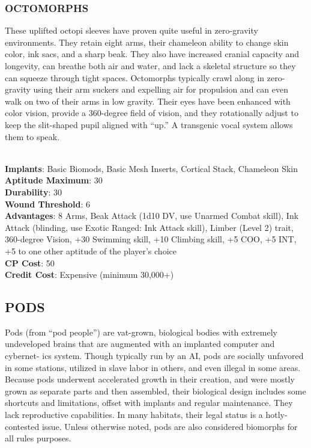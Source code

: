 \subsubsection{OCTOMORPHS}
These uplifted octopi sleeves have proven quite useful in zero-gravity
environments. They retain eight arms, their chameleon ability to change skin
color, ink sacs, and a sharp beak. They also have increased cranial capacity
and longevity, can breathe both air and water, and lack a skeletal structure so
they can squeeze through tight spaces. Octomorphs typically crawl along in
zero-gravity using their arm suckers and expelling air for propulsion and can
even walk on two of their arms in low gravity. Their eyes have been enhanced
with color vision, provide a 360-degree field of vision, and they rotationally
adjust to keep the slit-shaped pupil aligned with “up.” A transgenic vocal
system allows them to speak.

\\ \textbf{Implants}: Basic Biomods, Basic Mesh Inserts, Cortical Stack, Chameleon Skin
\\ \textbf{Aptitude Maximum}: 30
\\ \textbf{Durability}: 30
\\ \textbf{Wound Threshold}: 6
\\ \textbf{Advantages}: 8 Arms, Beak Attack (1d10 DV, use Unarmed Combat skill), Ink Attack (blinding, use
Exotic Ranged: Ink Attack skill), Limber (Level 2) trait, 360-degree Vision, +30 Swimming skill, +10 Climbing skill, +5 COO, +5 INT, +5 to one other aptitude of the player’s choice 
\\ \textbf{CP Cost}: 50
\\ \textbf{Credit Cost}: Expensive (minimum 30,000+)

\subsection{PODS}
Pods (from “pod people”) are vat-grown, biological bodies with extremely
undeveloped brains that are augmented with an implanted computer and cybernet-
ics system. Though typically run by an AI, pods are socially unfavored in some
stations, utilized in slave labor in others, and even illegal in some
areas. Because pods underwent accelerated growth in their creation, and were
mostly grown as separate parts and then assembled, their biological design
includes some shortcuts and limitations, offset with implants and regular
maintenance. They lack reproductive capabilities. In many habitats, their legal
status is a hotly-contested issue.  Unless otherwise noted, pods are also
considered biomorphs for all rules purposes.

